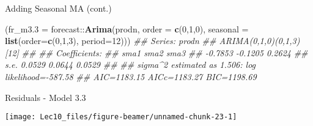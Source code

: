 \documentclass[11pt,ignorenonframetext,]{beamer}
\newenvironment{Shaded}{}{}
\newcommand{\CommentTok}[1]{\textcolor[rgb]{0.38,0.63,0.69}{\textit{#1}}}
\newcommand{\DataTypeTok}[1]{\textcolor[rgb]{0.56,0.13,0.00}{#1}}
\newcommand{\DecValTok}[1]{\textcolor[rgb]{0.25,0.63,0.44}{#1}}
\newcommand{\KeywordTok}[1]{\textcolor[rgb]{0.00,0.44,0.13}{\textbf{#1}}}
\newcommand{\NormalTok}[1]{#1}
\newcommand{\OperatorTok}[1]{\textcolor[rgb]{0.40,0.40,0.40}{#1}}
\let\oldShaded\Shaded
\let\endoldShaded\endShaded
\renewenvironment{Shaded}{\footnotesize\begin{spacing}{0.9}\oldShaded}{\endoldShaded\end{spacing}}
\let\oldverbatim\verbatim
\let\endoldverbatim\endverbatim
\newcommand{\scriptoutput}{
  \renewenvironment{Shaded}{\scriptsize\begin{spacing}{0.9}\oldShaded}{\endoldShaded\end{spacing}}
  \renewenvironment{verbatim}{\scriptsize\begin{spacing}{0.9}\oldverbatim}{\endoldverbatim\end{spacing}}
}
\begin{document}
\begin{frame}[fragile,t]{Adding Seasonal MA (cont.)}
\protect\hypertarget{adding-seasonal-ma-cont.}{}

\scriptoutput

\begin{Shaded}
\begin{Highlighting}[]
\NormalTok{(}\DataTypeTok{fr_m3.3 =}\NormalTok{ forecast}\OperatorTok{::}\KeywordTok{Arima}\NormalTok{(prodn, }\DataTypeTok{order =} \KeywordTok{c}\NormalTok{(}\DecValTok{0}\NormalTok{,}\DecValTok{1}\NormalTok{,}\DecValTok{0}\NormalTok{), }
            \DataTypeTok{seasonal =} \KeywordTok{list}\NormalTok{(}\DataTypeTok{order=}\KeywordTok{c}\NormalTok{(}\DecValTok{0}\NormalTok{,}\DecValTok{1}\NormalTok{,}\DecValTok{3}\NormalTok{), }\DataTypeTok{period=}\DecValTok{12}\NormalTok{)))}
\CommentTok{## Series: prodn }
\CommentTok{## ARIMA(0,1,0)(0,1,3)[12] }
\CommentTok{## }
\CommentTok{## Coefficients:}
\CommentTok{##          sma1     sma2    sma3}
\CommentTok{##       -0.7853  -0.1205  0.2624}
\CommentTok{## s.e.   0.0529   0.0644  0.0529}
\CommentTok{## }
\CommentTok{## sigma^2 estimated as 1.506:  log likelihood=-587.58}
\CommentTok{## AIC=1183.15   AICc=1183.27   BIC=1198.69}
\end{Highlighting}
\end{Shaded}

\end{frame}

\begin{frame}{Residuals - Model 3.3}
\protect\hypertarget{residuals---model-3.3}{}

\begin{center}\texttt{[image: Lec10\_files/figure-beamer/unnamed-chunk-23-1]} \end{center}

\end{frame}
\end{document}
